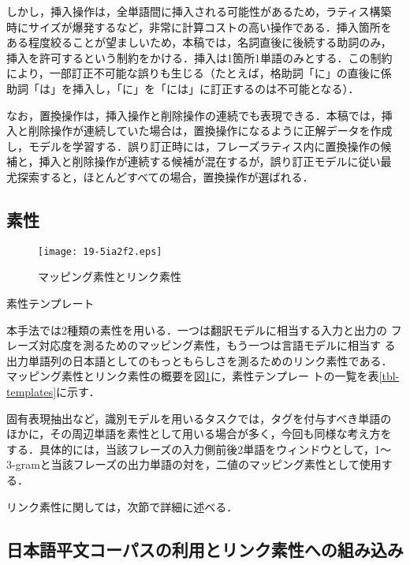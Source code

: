 \documentclass[japanese]{jnlp_1.4}
\begin{document}
しかし，挿入操作は，全単語間に挿入される可能性があるため，ラティス構築
時にサイズが爆発するなど，非常に計算コストの高い操作である．挿入箇所を
ある程度絞ることが望ましいため，本稿では，名詞直後に後続する助詞のみ，
挿入を許可するという制約をかける．挿入は1箇所1単語のみとする．この制約
により，一部訂正不可能な誤りも生じる（たとえば，格助詞「に」の直後に係
助詞「は」を挿入し，「に」を「には」に訂正するのは不可能となる）．

なお，置換操作は，挿入操作と削除操作の連続でも表現できる．本稿では，挿
入と削除操作が連続していた場合は，置換操作になるように正解データを作成
し，モデルを学習する．誤り訂正時には，フレーズラティス内に置換操作の候
補と，挿入と削除操作が連続する候補が混在するが，誤り訂正モデルに従い最
尤探索すると，ほとんどすべての場合，置換操作が選ばれる．


\subsection{素性}

\begin{figure}[b]
\begin{center}
\texttt{[image: 19-5ia2f2.eps]}
\end{center}
\caption{マッピング素性とリンク素性}
\label{fig-features}
\end{figure}
\begin{table}[b]
\caption{素性テンプレート}
\label{tbl-templates}

\end{table}

本手法では2種類の素性を用いる．一つは翻訳モデルに相当する入力と出力の
フレーズ対応度を測るためのマッピング素性，もう一つは言語モデルに相当す
る出力単語列の日本語としてのもっともらしさを測るためのリンク素性である．
マッピング素性とリンク素性の概要を図\ref{fig-features}に，素性テンプレー
トの一覧を表\ref{tbl-templates}に示す．

固有表現抽出など，識別モデルを用いるタスクでは，タグを付与すべき単語の
ほかに，その周辺単語を素性として用いる場合が多く，今回も同様な考え方を
する．具体的には，当該フレーズの入力側前後2単語をウィンドウとして，1〜
3-gramと当該フレーズの出力単語の対を，二値のマッピング素性として使用す
る．


リンク素性に関しては，次節で詳細に述べる．



\subsection{日本語平文コーパスの利用とリンク素性への組み込み}
\end{document}
